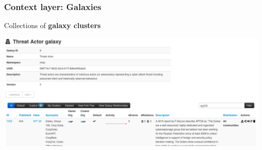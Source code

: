 \begin{frame}
    \frametitle{Context layer: Galaxies}
    Collections of {\bf galaxy clusters}
    \begin{center}
        \includegraphics[width=1.0\linewidth]{screenshots/galaxy.png}
    \end{center}
\end{frame}

